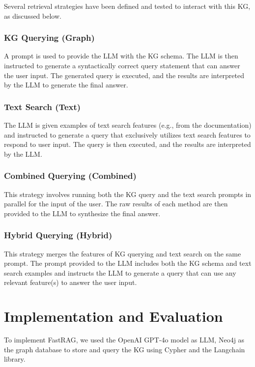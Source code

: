 \documentclass[conference]{IEEEtran}
\begin{document}
Several retrieval strategies have been defined and tested to interact with this KG, as discussed below.

\subsubsection{KG Querying (Graph)}
A prompt is used to provide the LLM with the KG schema. The LLM is then instructed to generate a syntactically correct query statement that can answer the user input. The generated query is executed, and the results are interpreted by the LLM to generate the final answer.

\subsubsection{Text Search (Text)}
The LLM is given examples of text search features (e.g., from the documentation) and instructed to generate a query that exclusively utilizes text search features to respond to user input. The query is then executed, and the results are interpreted by the LLM.

\subsubsection{Combined Querying (Combined)}
This strategy involves running both the KG query and the text search prompts in parallel for the input of the user. The raw results of each method are then provided to the LLM to synthesize the final answer.

\subsubsection{Hybrid Querying (Hybrid)}
This strategy merges the features of KG querying and text search on the same prompt. The prompt provided to the LLM includes both the KG schema and text search examples and instructs the LLM to generate a query that can use any relevant feature(s) to answer the user input.


\section{Implementation and Evaluation}\label{evaluation}
To implement FastRAG, we used the OpenAI GPT-4o model as LLM, Neo4j as the graph database to store and query the KG using Cypher and the Langchain library.
\end{document}

